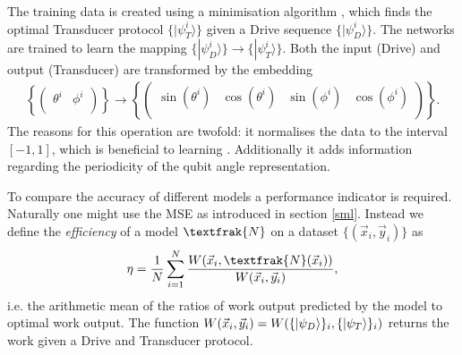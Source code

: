 The training data is created using a minimisation algorithm \cite{2020SciPy-NMeth}, which finds the optimal Transducer protocol $\{|\psi_T^i \rangle\}$ given a Drive sequence $\{|\psi_D^i \rangle\}$.
The networks are trained to learn the mapping $\{|\psi_D^i \rangle\} \to \{|\psi_T^i \rangle\}$.
Both the input (Drive) and output (Transducer) are transformed by the embedding
\begin{align*}
	\left\{
	\begin{pmatrix}
	\theta^i & \phi^i \\
	\end{pmatrix}
	\right\}
	\to
	\left\{
	\begin{pmatrix}
	\sin(\theta^i) & \cos(\theta^i) & \sin(\phi^i) & \cos(\phi^i) \\
	\end{pmatrix}
	\right\}.
\end{align*}
The reasons for this operation are twofold: it normalises the data to the interval $[-1, 1]$, which is beneficial to learning \cite{LeCun2012}. Additionally it adds information regarding the periodicity of the qubit angle representation.


To compare the accuracy of different models a performance indicator is required. 
Naturally one might use the MSE as introduced in section \ref{sml}.
Instead we define the \textit{efficiency} of a model $\textfrak{N}$ on a dataset $\{(\vec{x}_i, \vec{y}_i)\}$ as
\begin{align}
	\eta = \frac{1}{N} \sum_{i=1}^N \frac{W(\vec{x}_i,\textfrak{N}(\vec{x}_i))}{W(\vec{x}_i,\vec{y}_i)},
\end{align}
i.e. the arithmetic mean of the ratios of work output predicted by the model to optimal work output.
The function $W(\vec{x}_i, \vec{y}_i) = W(\{\ket{\psi_D}\}_i, \{\ket{\psi_T}\}_i)$ returns the work given a Drive and Transducer protocol.
